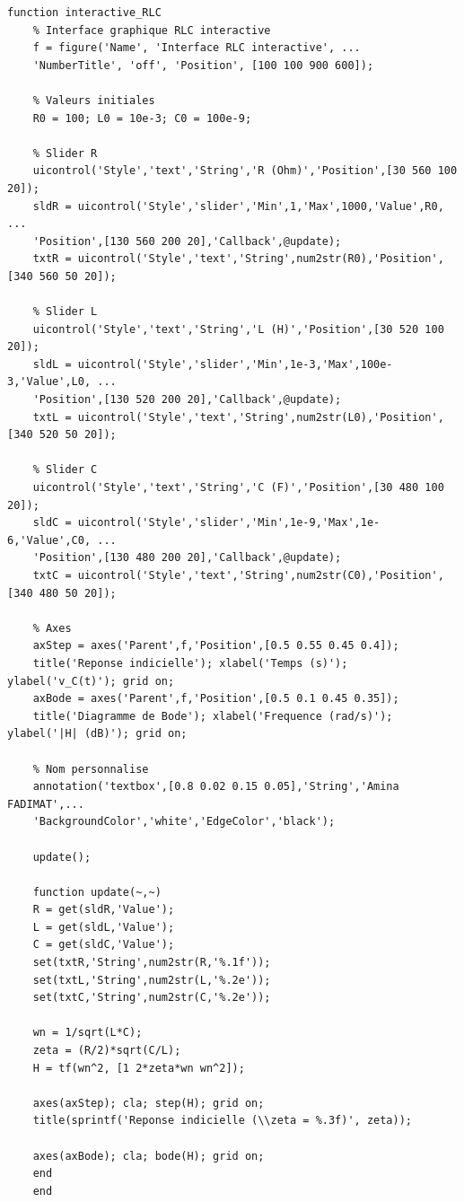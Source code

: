 \documentclass[12pt,a4paper]{article}
\begin{document}
	\begin{lstlisting}[caption=Interface RLC interactive]
	function interactive_RLC
	% Interface graphique RLC interactive
	f = figure('Name', 'Interface RLC interactive', ...
	'NumberTitle', 'off', 'Position', [100 100 900 600]);
	
	% Valeurs initiales
	R0 = 100; L0 = 10e-3; C0 = 100e-9;
	
	% Slider R
	uicontrol('Style','text','String','R (Ohm)','Position',[30 560 100 20]);
	sldR = uicontrol('Style','slider','Min',1,'Max',1000,'Value',R0, ...
	'Position',[130 560 200 20],'Callback',@update);
	txtR = uicontrol('Style','text','String',num2str(R0),'Position',[340 560 50 20]);
	
	% Slider L
	uicontrol('Style','text','String','L (H)','Position',[30 520 100 20]);
	sldL = uicontrol('Style','slider','Min',1e-3,'Max',100e-3,'Value',L0, ...
	'Position',[130 520 200 20],'Callback',@update);
	txtL = uicontrol('Style','text','String',num2str(L0),'Position',[340 520 50 20]);
	
	% Slider C
	uicontrol('Style','text','String','C (F)','Position',[30 480 100 20]);
	sldC = uicontrol('Style','slider','Min',1e-9,'Max',1e-6,'Value',C0, ...
	'Position',[130 480 200 20],'Callback',@update);
	txtC = uicontrol('Style','text','String',num2str(C0),'Position',[340 480 50 20]);
	
	% Axes
	axStep = axes('Parent',f,'Position',[0.5 0.55 0.45 0.4]);
	title('Reponse indicielle'); xlabel('Temps (s)'); ylabel('v_C(t)'); grid on;
	axBode = axes('Parent',f,'Position',[0.5 0.1 0.45 0.35]);
	title('Diagramme de Bode'); xlabel('Frequence (rad/s)'); ylabel('|H| (dB)'); grid on;
	
	% Nom personnalise
	annotation('textbox',[0.8 0.02 0.15 0.05],'String','Amina FADIMAT',...
	'BackgroundColor','white','EdgeColor','black');
	
	update();
	
	function update(~,~)
	R = get(sldR,'Value');
	L = get(sldL,'Value');
	C = get(sldC,'Value');
	set(txtR,'String',num2str(R,'%.1f'));
	set(txtL,'String',num2str(L,'%.2e'));
	set(txtC,'String',num2str(C,'%.2e'));
	
	wn = 1/sqrt(L*C);
	zeta = (R/2)*sqrt(C/L);
	H = tf(wn^2, [1 2*zeta*wn wn^2]);
	
	axes(axStep); cla; step(H); grid on;
	title(sprintf('Reponse indicielle (\\zeta = %.3f)', zeta));
	
	axes(axBode); cla; bode(H); grid on;
	end
	end
	\end{lstlisting}
	
\end{document}

